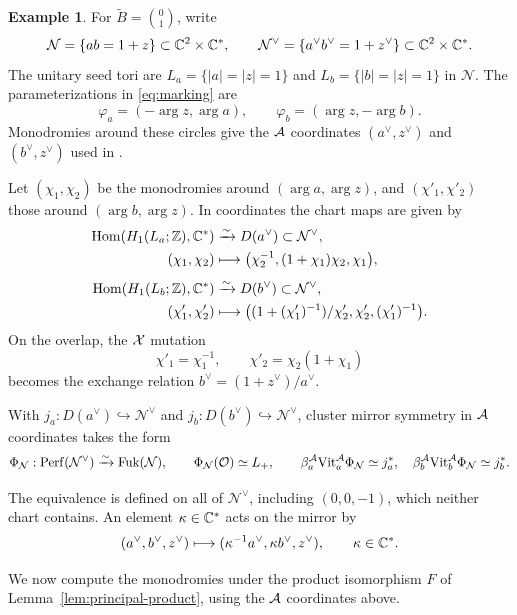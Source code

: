\documentclass[12pt, letter]{amsart}
\theoremstyle{definition}
\newtheorem{example}[theorem]{Example}
\newcommand{\Z}{\mathbb Z}
\newcommand{\OO}{\mathcal O}
\newcommand{\Nn}{\mathcal N}
\numberwithin{equation}{section}
\begin{document}
\begin{example}
For $\widetilde B=\binom01$, write
\[
 \Nn=\{ab=1+z\}\subset\C^2\times\C^*,\qquad
 \Nn^\vee=\{a^\vee b^\vee=1+z^\vee\}\subset\C^2\times\C^*.
\]
The unitary seed tori are $L_a=\{|a|=|z|=1\}$ and
$L_b=\{|b|=|z|=1\}$ in $\Nn$.
The parameterizations in \eqref{eq:marking} are
\[
 \varphi_a=(-\arg z,\arg a),\qquad
 \varphi_b=(\arg z,-\arg b).
\]
Monodromies around these circles give the $\mathcal{A}$ coordinates
$(a^\vee,z^\vee)$ and $(b^\vee,z^\vee)$ used in
\cite[Section~5.3]{HS}.

Let $(\chi_1,\chi_2)$ be the monodromies around $(\arg a,\arg z)$,
and $(\chi'_1,\chi'_2)$ those around $(\arg b,\arg z)$.
In coordinates the chart maps are given by
\[
 \begin{aligned}
 \operatorname{Hom}(H_1(L_a;\Z),\C^*)&\xrightarrow{\sim}D(a^\vee)\subset\Nn^\vee,\\
 (\chi_1,\chi_2)&\longmapsto
   \bigl(\chi_2^{-1},(1+\chi_1)\chi_2,\chi_1\bigr),\\[4pt]
 \operatorname{Hom}(H_1(L_b;\Z),\C^*)&\xrightarrow{\sim}D(b^\vee)\subset\Nn^\vee,\\
 (\chi'_1,\chi'_2)&\longmapsto
   \bigl((1+(\chi'_1)^{-1})/\chi'_2,\chi'_2,(\chi'_1)^{-1}\bigr).
 \end{aligned}
\]
On the overlap, the $\mathcal{X}$ mutation
\[
 \chi'_1=\chi_1^{-1},\qquad \chi'_2=\chi_2(1+\chi_1)
\]
becomes the exchange relation $b^\vee=(1+z^\vee)/a^\vee$.

With $j_a:D(a^\vee)\hookrightarrow\Nn^\vee$ and
$j_b:D(b^\vee)\hookrightarrow\Nn^\vee$, cluster mirror symmetry in
$\mathcal{A}$ coordinates takes the form
\[
 \Phi_{\Nn}:\Perf(\Nn^\vee)\xrightarrow{\sim}\Fuk(\Nn),\qquad
 \Phi_{\Nn}(\OO)\simeq L_+,\qquad
 \beta_a^{\cA}\mathrm{Vit}_a^{\cA}\Phi_{\Nn}\simeq j_a^*,\quad
 \beta_b^{\cA}\mathrm{Vit}_b^{\cA}\Phi_{\Nn}\simeq j_b^*.
\]


The equivalence is defined on all of $\Nn^\vee$, including $(0,0,-1)$,
which neither chart contains.
An element $\kappa\in\mathbb C^*$ acts on the mirror by
\[
(a^\vee,b^\vee,z^\vee)\longmapsto
(\kappa^{-1}a^\vee,\kappa b^\vee,z^\vee), \qquad \kappa \in \mathbb{C}^*. 
\]
\end{example}



We now compute the monodromies under the product isomorphism $F$ of
Lemma~\ref{lem:principal-product}, using the $\mathcal{A}$ coordinates above.
\end{document}
